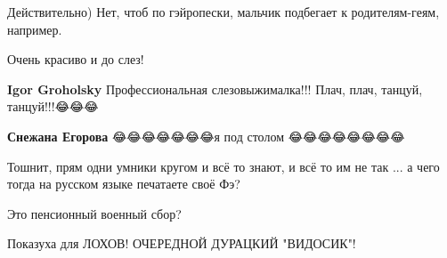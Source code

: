 \begin{itemize}
Действительно) Нет, чтоб по гэйропески, мальчик подбегает к родителям-геям, например.

 
Очень красиво и до слез!

\begin{itemize}
 
\textbf{Igor Groholsky} Профессиональная слезовыжималка!!!
Плач, плач, танцуй, танцуй!!!😂😂😂

 
\textbf{Снежана Егорова} 😂😂😂😂😂😂😂я под столом 😂😂😂😂😂😂😂😂
\end{itemize}

 
Тошнит, прям одни умники кругом и всё то знают, и всё то им не так ... а чего тогда на русском языке печатаете своё Фэ?

 
Это пенсионный военный сбор?

 
Показуха для ЛОХОВ! ОЧЕРЕДНОЙ ДУРАЦКИЙ "ВИДОСИК"!


\end{itemize}

